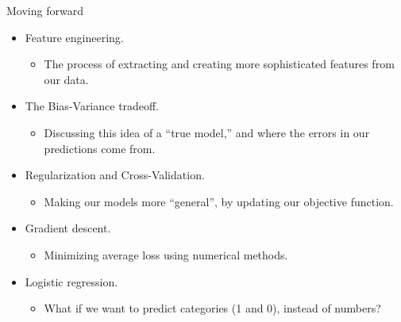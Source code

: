 \documentclass[aspectratio=169]{../latex_main/tntbeamer}  %
\begin{document}
	
	\begin{frame}{Moving forward}

	    \begin{itemize}
	        \item Feature engineering.
	        \begin{itemize}
	            \item The process of extracting and creating more sophisticated features from our data.
	        \end{itemize}
	        \item The Bias-Variance tradeoff.
	        \begin{itemize}
	            \item Discussing this idea of a “true model,” and where the errors in our predictions come from.
	        \end{itemize}
	        \item Regularization and Cross-Validation.
	        \begin{itemize}
	            \item Making our models more “general”, by updating our objective function.
	        \end{itemize}
	        \item Gradient descent.
	        \begin{itemize}
	            \item Minimizing average loss using numerical methods.
	        \end{itemize}
	        \item Logistic regression.
	        \begin{itemize}
	            \item What if we want to predict categories (1 and 0), instead of numbers?
	        \end{itemize}
	    \end{itemize}
	\end{frame}
	
\end{document}
